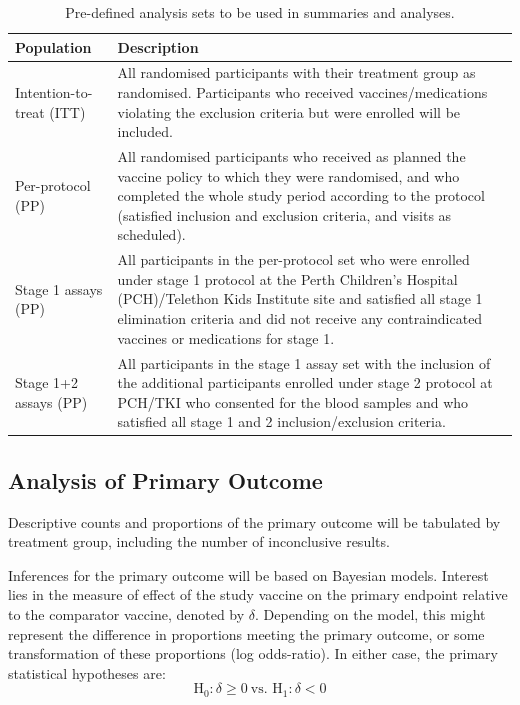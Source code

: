 \documentclass{bmcart}
\begin{document}
\renewcommand{\arraystretch}{2}
\begin{table}[!ht]
	\caption{Pre-defined analysis sets to be used in summaries and analyses.}
	\label{tab:analysis-sets}
	\begin{tabular}{lp{8cm}}
		Population & Description \\ \hline
		Intention-to-treat (ITT) & All randomised participants with their treatment group as randomised. Participants who received vaccines/medications violating the exclusion criteria but were enrolled will be included. \\
		Per-protocol (PP) & All randomised participants who received as planned the vaccine policy to which they were randomised, and who completed the whole study period according to the protocol (satisfied inclusion and exclusion criteria, and visits as scheduled).
		\\
		Stage 1 assays (PP) & All participants in the per-protocol set who were enrolled under stage 1 protocol at the Perth Children's Hospital (PCH)/Telethon Kids Institute site and satisfied all stage 1 elimination criteria and did not receive any contraindicated vaccines or medications for stage 1.\\
		Stage 1+2 assays (PP) & All participants in the stage 1 assay set with the inclusion of the additional participants enrolled under stage 2 protocol at PCH/TKI who consented for the blood samples and who satisfied all stage 1 and 2 inclusion/exclusion criteria. \\
		\hline
	\end{tabular}
\end{table}
\renewcommand{\arraystretch}{1.25}

\subsection*{Analysis of Primary Outcome}

Descriptive counts and proportions of the primary outcome will be tabulated by treatment group, including the number of inconclusive results.

Inferences for the primary outcome will be based on Bayesian models. Interest lies in the measure of effect of the study vaccine on the primary endpoint relative to the comparator vaccine, denoted by \(\delta\).
Depending on the model, this might represent the difference in proportions meeting the primary outcome, or some transformation of these proportions (log odds-ratio).
In either case, the primary statistical hypotheses are:
$$
\textrm{H}_0:\delta\geq 0\ \text{vs. } \mathrm{H}_1:\delta <0
$$
\end{document}

